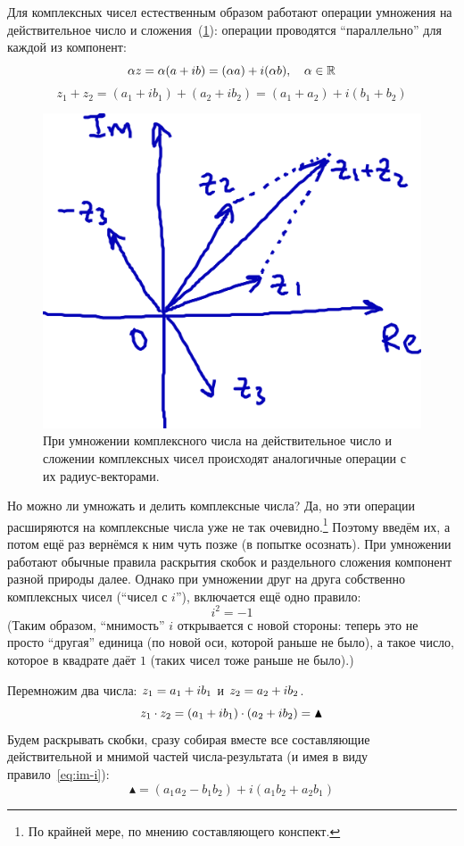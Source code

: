 \documentclass[a4paper,12pt]{article}
\begin{document}
  Для комплексных чисел естественным образом работают операции умножения на действительное число и сложения~(\ref{fig:alpha-mul-and-plus-for-c}): операции проводятся ``параллельно'' для каждой из компонент:
  \[
    \alpha z = \alpha (a + ib) = (\alpha a) + i (\alpha b),\quad \alpha \in \operatorname{\mathbb R}
  \]
  \[
    z_1 + z_2 = (a_1 + ib_1) + (a_2 + ib_2) = (a_1 + a_2) + i (b_1 + b_2)
  \]

  \begin{figure}[ht]
    \centering
    \includegraphics[width=0.6\linewidth]{images/alpha-mul-and-plus-for-c}
    
    \caption{
      При умножении комплексного числа на действительное число и сложении комплексных чисел происходят аналогичные операции с их радиус-векторами.
    }
    \label{fig:alpha-mul-and-plus-for-c}
  \end{figure}

  Но можно ли умножать и делить комплексные числа?
  Да, но эти операции расширяются на комплексные числа уже не так очевидно.\footnote{
    По крайней мере, по мнению составляющего конспект.
  }
  Поэтому введём их, а потом ещё раз вернёмся к ним чуть позже (в попытке осознать).
  При умножении работают обычные правила раскрытия скобок и раздельного сложения компонент разной природы далее.
  Однако при умножении друг на друга собственно комплексных чисел (``чисел с $i$''), включается ещё одно правило:
  \begin{equation}\label{eq:im-i}
      i^2 = -1
  \end{equation}
  (Таким образом, ``мнимость'' $i$ открывается с новой стороны: теперь это не просто ``другая'' единица (по новой оси, которой раньше не было), а такое число, которое в квадрате даёт $1$ (таких чисел тоже раньше не было).)

  \begin{example}
    Перемножим два числа: $z_1 \hm= a_1 \hm+ i b_1$ и $z_2 \hm= a_2 \hm+ i b_2$.
    \[
      z_1 \cdot z_2 = (a_1 \hm+ i b_1) \cdot (a_2 \hm+ i b_2) = \blacktriangle
    \]
    Будем раскрывать скобки, сразу собирая вместе все составляющие действительной и мнимой частей числа-результата (и имея в виду правило~\eqref{eq:im-i}):
    \[
      \blacktriangle = (a_1 a_2 - b_1 b_2) + i(a_1 b_2 + a_2 b_1)
    \]
  \end{example}
\end{document}
